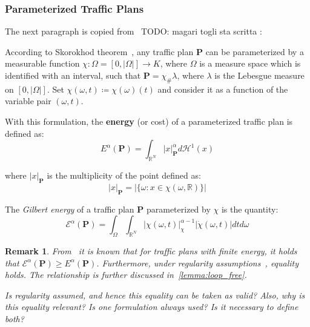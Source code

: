 \documentclass[12pt,a4paper]{article}
\numberwithin{equation}{section}
\theoremstyle{mytheorem}
\theoremstyle{myremark}
\newtheorem{remark}[subsection]{Remark}
\theoremstyle{myparagraph}
\begin{document}
    \subsubsection*{Parameterized Traffic Plans}
    The next paragraph is copied from~\cite{Bernot} TODO: magari togli sta scritta :

    According to Skorokhod theorem~\cite[Theorem A.3]{Bernot}, any traffic plan $\mathbf{P}$ can be parameterized by a measurable function
    $\chi : \Omega = [0, |\Omega|] \rightarrow K$, where $\Omega$ is a measure space which is identified with an interval, such that
    $\mathbf{P}= \chi_{\#} \lambda$, where $\lambda$ is the Lebesgue measure on $[0, |\Omega|]$.
    Set $\chi(\omega, t) \coloneqq \chi(\omega)(t)$ and consider it as a function of the variable pair
    $(\omega, t)$.

    With this formulation, the \textbf{energy} (or cost) of a parameterized traffic plan is defined as:
    \begin{equation}
        E^{\alpha}(\mathbf{P}) = \int_{\mathbb{R}^N} |x|_\mathbf{P}^{\alpha} d \mathcal{H}^1(x)
        \label{eq:energy}
    \end{equation}

    where $|x|_\mathbf{P}$ is the multiplicity of the point defined as:
    \begin{equation}
        |x|_\mathbf{P} = | \{\omega: x \in \chi(\omega, \mathbb{R}) \} |
    \end{equation}

    The \emph{Gilbert energy} of a traffic plan $\mathbf{P}$ parameterized by $\chi$ is the quantity:
    \begin{equation}
        \mathcal{E}^{\alpha}(\mathbf{P}) = \int_{\Omega} \int_{\mathbb{R}^N} |\chi(\omega, t)|^{\alpha-1}_\chi |\dot{\chi} (\omega, t)| dtd\omega
    \end{equation}

    \begin{remark}
    From~\cite[Proposition 4.8]{Bernot} it is known that for traffic plans with finite energy, it holds that $\mathcal{E} ^\alpha(\mathbf{P}) \ge E^\alpha (\mathbf{P})$.
    Furthermore, under regularity assumptions~\cite[definition 4.7]{Bernot}, equality holds.
    The relationship is further discussed in~\ref{lemma:loop_free}.

    {\color{red} Is regularity assumed, and hence this equality can be taken as valid?
    Also, why is this equality relevant? Is one formulation always used? Is it necessary to define both?}
    \end{remark}
\end{document}
